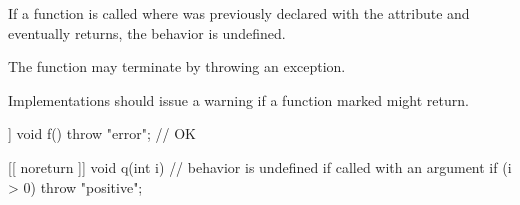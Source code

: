 \pnum
If a function  is called where  was previously declared with the 
attribute and  eventually returns, the behavior is undefined. \begin{note} The function may
terminate by throwing an exception. \end{note} \begin{note} Implementations should issue a
warning if a function marked \tcode{[[noreturn]]} might return. \end{note}

\pnum
\begin{example}
\begin{codeblock}
[[ noreturn ]] void f() {
  throw "error";                // OK
}

[[ noreturn ]] void q(int i) {  // behavior is undefined if called with an argument 
  if (i > 0)
    throw "positive";
}
\end{codeblock}
\end{example}
